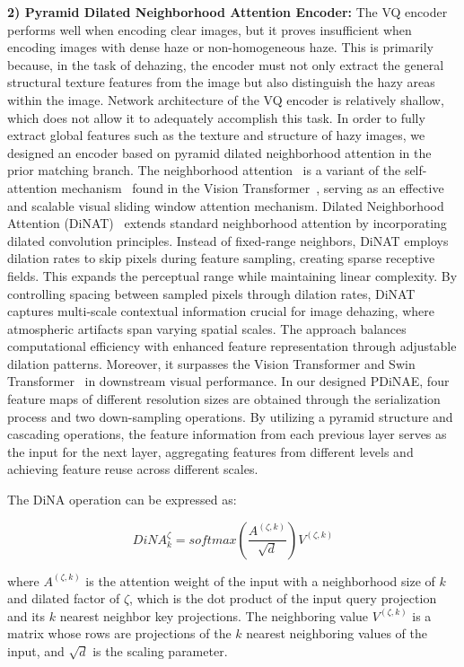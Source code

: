 \documentclass[journal]{IEEEtran}
\begin{document}
	{\bf{2) Pyramid Dilated Neighborhood Attention Encoder:}} The VQ encoder performs well when encoding clear images, but it proves insufficient when encoding images with dense haze or non-homogeneous haze. This is primarily because, in the task of dehazing, the encoder must not only extract the general structural texture features from the image but also distinguish the hazy areas within the image. Network architecture of the VQ encoder is relatively shallow, which does not allow it to adequately accomplish this task. In order to fully extract global features such as the texture and structure of hazy images, we designed an encoder based on pyramid dilated neighborhood attention in the prior matching branch. The neighborhood attention~\cite{hassani2023neighborhood} is a variant of the self-attention mechanism~\cite{vaswani2017attention} found in the Vision Transformer~\cite{dosovitskiy2020image}, serving as an effective and scalable visual sliding window attention mechanism. Dilated Neighborhood Attention (DiNAT)~\cite{hassani2022dilated} extends standard neighborhood attention by incorporating dilated convolution principles. Instead of fixed-range neighbors, DiNAT employs dilation rates to skip pixels during feature sampling, creating sparse receptive fields. This expands the perceptual range while maintaining linear complexity. By controlling spacing between sampled pixels through dilation rates, DiNAT captures multi-scale contextual information crucial for image dehazing, where atmospheric artifacts span varying spatial scales. The approach balances computational efficiency with enhanced feature representation through adjustable dilation patterns. Moreover, it surpasses the Vision Transformer and Swin Transformer~\cite{liu2021swin} in downstream visual performance. In our designed PDiNAE, four feature maps of different resolution sizes are obtained through the serialization process and two down-sampling operations. By utilizing a pyramid structure and cascading operations, the feature information from each previous layer serves as the input for the next layer, aggregating features from different levels and achieving feature reuse across different scales.

The DiNA operation can be expressed as:

\begin{equation}
	\label{NA_operation}
	DiNA^{\zeta}_{k} = softmax (\frac{A^{(\zeta, k)}}{\sqrt{d}}) V^{(\zeta, k)}
\end{equation}

\noindent where $A^{(\zeta, k)}$ is the attention weight of the input with a neighborhood size of $k$ and dilated factor of $\zeta$, which is the dot product of the input query projection and its $k$ nearest neighbor key projections. The neighboring value $V^{(\zeta, k)}$ is a matrix whose rows are projections of the $k$ nearest neighboring values of the input, and $\sqrt{d}$ is the scaling parameter.
\end{document}
